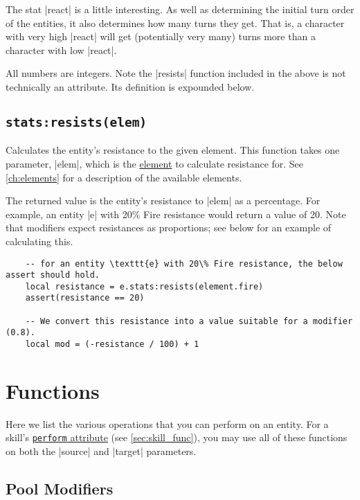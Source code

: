 The stat |react| is a little interesting.
As well as determining the initial turn order of the entities,
it also determines how many turns they get.
That is, a character with very high |react| will get
(potentially very many) turns more than a character with low |react|.

All numbers are integers.
Note the |resists| function included in the above is not technically an attribute.
Its definition is expounded below.

\subsection{\lstinline{stats:resists(elem)}}
\label{sec:entity_stats_resists}

Calculates the entity's resistance to the given element.
This function takes one parameter, |elem|,
which is the \hyperref[ch:elements]{element} to calculate resistance for.
See \autoref{ch:elements} for a description of the available elements.

The returned value is the entity's resistance to |elem| as a percentage.
For example, an entity |e| with 20\% Fire resistance would return a value
of 20. Note that modifiers expect resistances as proportions; see below for
an example of calculating this.

\begin{lstlisting}
    -- for an entity \texttt{e} with 20\% Fire resistance, the below assert should hold.
    local resistance = e.stats:resists(element.fire)
    assert(resistance == 20)

    -- We convert this resistance into a value suitable for a modifier (0.8).
    local mod = (-resistance / 100) + 1
\end{lstlisting}

\section{Functions}
\label{sec:entity_func}

Here we list the various operations that you can perform on an entity.
For a skill's \hyperref[sec:skill_func]{\lstinline{perform} attribute}
(see \autoref{sec:skill_func}),
you may use all of these functions on both the |source| and |target| parameters.

\subsection{Pool Modifiers}
\label{sec:entity_func_pool}

